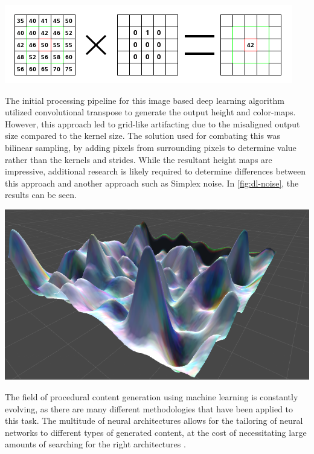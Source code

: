 \documentclass[10pt]{report}
\begin{document}
		\begin{minipage}{\textwidth}
			\centering
			\includegraphics[scale=1]{convolution-calculate}
			\label{fig:gimp}
		\end{minipage}
		
		The initial processing pipeline for this image based deep learning algorithm utilized convolutional transpose to generate the output height and color-maps. However, this approach led to grid-like artifacting due to the misaligned output size compared to the kernel size. The solution used for combating this was bilinear sampling, by adding pixels from surrounding pixels to determine value rather than the kernels and strides. While the resultant height maps are impressive, additional research is likely required to determine differences between this approach and another approach such as Simplex noise. In \autoref{fig:dl-noise}, the results can be seen. 
		
		\begin{minipage}{\textwidth}
			\centering
			\includegraphics[scale=.3]{rolling}
			\label{fig:dl-noise}
		\end{minipage}
	
		The field of procedural content generation using machine learning is constantly evolving, as there are many different methodologies that have been applied to this task. The multitude of neural architectures allows for the tailoring of neural networks to different types of generated content, at the cost of necessitating large amounts of searching for the right architectures \cite{Liu_2020}.
		
\end{document}
